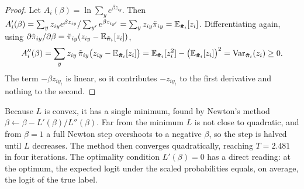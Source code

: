\begin{proof}
Let $A_i(\beta) = \ln \sum_y e^{\beta z_{iy}}$. Then $A_i'(\beta) = \sum_y z_{iy} e^{\beta z_{iy}} / \sum_{y'} e^{\beta z_{iy'}} = \sum_y z_{iy}\tilde{\pi}_{iy} = \mathbb{E}_{\tilde{\bm{\pi}}_i}[z_i]$. Differentiating again, using $\partial \tilde{\pi}_{iy}/\partial\beta = \tilde{\pi}_{iy}(z_{iy} - \mathbb{E}_{\tilde{\bm{\pi}}_i}[z_i])$,
\[
  A_i''(\beta) = \sum_y z_{iy}\,\tilde{\pi}_{iy}\bigl(z_{iy} - \mathbb{E}_{\tilde{\bm{\pi}}_i}[z_i]\bigr) = \mathbb{E}_{\tilde{\bm{\pi}}_i}[z_i^2] - \bigl(\mathbb{E}_{\tilde{\bm{\pi}}_i}[z_i]\bigr)^2 = \operatorname{Var}_{\tilde{\bm{\pi}}_i}(z_i) \ge 0 .
\]
The term $-\beta z_{iy_i}$ is linear, so it contributes $-z_{iy_i}$ to the first derivative and nothing to the second.
\end{proof}

Because $L$ is convex, it has a single minimum, found by Newton's method $\beta \leftarrow \beta - L'(\beta)/L''(\beta)$. Far from the minimum $L$ is not close to quadratic, and from $\beta = 1$ a full Newton step overshoots to a negative $\beta$, so the step is halved until $L$ decreases. The method then converges quadratically, reaching $T = 2.481$ in four iterations. The optimality condition $L'(\beta) = 0$ has a direct reading: at the optimum, the expected logit under the scaled probabilities equals, on average, the logit of the true label.
